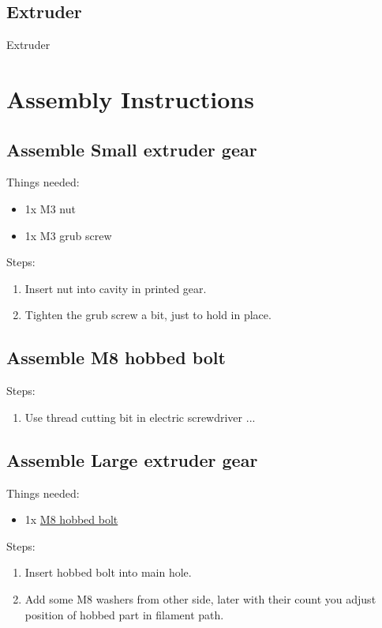\documentclass[11pt]{article}
\begin{document}
\hypertarget{thing_extruder}{\subsection{Extruder}}
Extruder

\newpage

\section{Assembly Instructions}

\subsection{Assemble Small extruder gear}
Things needed:
\begin{itemize}
\item 1x M3 nut
\item 1x M3 grub screw
\end{itemize}
Steps:
\begin{enumerate}
\item Insert nut into cavity in printed gear.
\item Tighten the grub screw a bit, just to hold in place.
\end{enumerate}

\subsection{Assemble M8 hobbed bolt}Steps:
\begin{enumerate}
\item Use thread cutting bit in electric screwdriver ...
\end{enumerate}

\subsection{Assemble Large extruder gear}
Things needed:
\begin{itemize}
\item 1x \hyperlink{thing_hobbed-bolt}{M8 hobbed bolt}
\end{itemize}
Steps:
\begin{enumerate}
\item Insert hobbed bolt into main hole.
\item Add some M8 washers from other side, later with their count you adjust position of hobbed part in filament path.
\end{enumerate}
\end{document}
